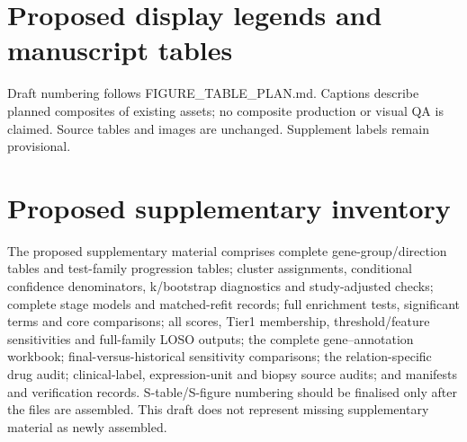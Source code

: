 \documentclass[11pt,a4paper]{article}
\begin{document}
\section*{Proposed display legends and manuscript tables}

Draft numbering follows FIGURE\_TABLE\_PLAN.md. Captions describe planned composites of existing assets; no composite production or visual QA is claimed. Source tables and images are unchanged. Supplement labels remain provisional.

\section*{Proposed supplementary inventory}
The proposed supplementary material comprises complete gene-group/direction tables and test-family progression tables; cluster assignments, conditional confidence denominators, k/bootstrap diagnostics and study-adjusted checks; complete stage models and matched-refit records; full enrichment tests, significant terms and core comparisons; all scores, Tier1 membership, threshold/feature sensitivities and full-family LOSO outputs; the complete gene–annotation workbook; final-versus-historical sensitivity comparisons; the relation-specific drug audit; clinical-label, expression-unit and biopsy source audits; and manifests and verification records. S-table/S-figure numbering should be finalised only after the files are assembled. This draft does not represent missing supplementary material as newly assembled.
\end{document}
